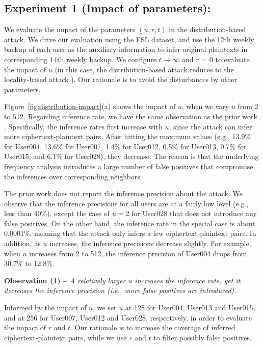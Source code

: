 \subsection{Experiment 1 (Impact of parameters):}
We evaluate the impact of the parameters $(u, r, t)$ in the distribution-based
attack. We drive our evaluation using the FSL dataset, and use the 12th weekly
backup of each user as the auxiliary information to infer original plaintexts
in corresponding 14th weekly backup.  We configure $t \rightarrow \infty$ and $r$ = 0 to
evaluate the impact of $u$ (in this case, the distribution-based attack
reduces to the locality-based attack \cite{li17}). Our rationale is to avoid
the disturbances by other parameters. 

Figure~\ref{fig:distribution-impact}(a) shows the impact of $u$,
when we vary $u$ from 2 to 512. Regarding inference rate, we have the same
observation as the prior work \cite{li17}. Specifically, the inference rates
first increase with $u$, since the attack can infer more ciphertext-plaintext
pairs. After hitting the maximum values (e.g., 13.9\% for User004, 13.6\% for
User007, 1.4\% for User012, 0.5\% for User013, 0.7\% for User015, and 6.1\%
for User028), they decrease.  The reason is that the underlying frequency
analysis introduces a large number of false positives that compromise the
inferences over corresponding neighbors.    

The prior work \cite{li17} does not report the inference precision about the
attack. We observe that the inference precisions for all users are at a
fairly low level (e.g., less than 40\%), except the case of $u = 2$ for
User028 that does not introduce any false positives. On the other hand, the
inference rate in the special case is about 0.0001\%, meaning that the attack
only infers a few ciphertext-plaintext pairs. In addition, as $u$ increases,
the inference precisions decrease slightly. For example, when $u$ increases
from 2 to 512, the inference precision of User004 drops from 30.7\% to 12.8\%.      

{\bf Observation (1) --} {\em A relatively larger $u$ increases the inference
rate, yet it decreases the inference precision (i.e., more false positives are
introduced). }

Informed by the impact of $u$, we set $u$ at 128 for User004, User013 and
User015, and at 256 for User007, User012 and User028, respectively, in order
to evaluate the impact of $r$ and $t$. 
Our rationale is to increase the coverage of inferred ciphertext-plaintext
pairs, while we use $r$ and $t$ to filter possibly false positives. 

